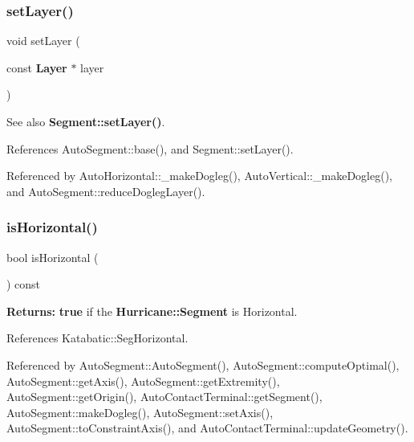 \subsubsection{\texorpdfstring{set\+Layer()}{setLayer()}}
{\footnotesize\ttfamily void set\+Layer (\begin{DoxyParamCaption}\item[{const \textbf{ Layer} $\ast$}]{layer }\end{DoxyParamCaption})\hspace{0.3cm}{\ttfamily [inline]}}

\begin{DoxySeeAlso}{See also}
\textbf{ Segment\+::set\+Layer()}. 
\end{DoxySeeAlso}


References Auto\+Segment\+::base(), and Segment\+::set\+Layer().



Referenced by Auto\+Horizontal\+::\+\_\+make\+Dogleg(), Auto\+Vertical\+::\+\_\+make\+Dogleg(), and Auto\+Segment\+::reduce\+Dogleg\+Layer().

\mbox{\label{classKatabatic_1_1AutoSegment_a21b9cefd33ae22e4c2070ad441bdd30b}} 
\subsubsection{\texorpdfstring{is\+Horizontal()}{isHorizontal()}}
{\footnotesize\ttfamily bool is\+Horizontal (\begin{DoxyParamCaption}{ }\end{DoxyParamCaption}) const\hspace{0.3cm}{\ttfamily [inline]}}

{\bfseries Returns\+:} {\bfseries true} if the \textbf{ Hurricane\+::\+Segment} is Horizontal. 

References Katabatic\+::\+Seg\+Horizontal.



Referenced by Auto\+Segment\+::\+Auto\+Segment(), Auto\+Segment\+::compute\+Optimal(), Auto\+Segment\+::get\+Axis(), Auto\+Segment\+::get\+Extremity(), Auto\+Segment\+::get\+Origin(), Auto\+Contact\+Terminal\+::get\+Segment(), Auto\+Segment\+::make\+Dogleg(), Auto\+Segment\+::set\+Axis(), Auto\+Segment\+::to\+Constraint\+Axis(), and Auto\+Contact\+Terminal\+::update\+Geometry().

